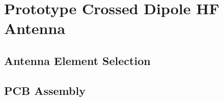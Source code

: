 \newpage
\section{Prototype Crossed Dipole HF Antenna}

\label{sec:prototype}

\subsection{Antenna Element Selection}
\label{subsec:proto_ant_element}

\subsection{PCB Assembly}
\label{subsec:proto_pcb}





